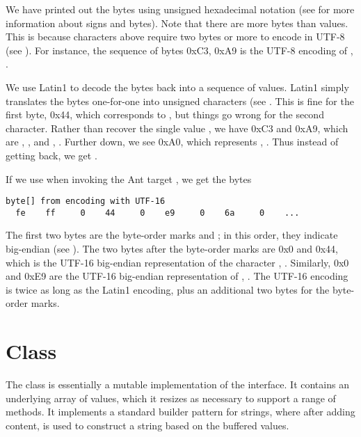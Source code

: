 We have printed out the bytes using unsigned hexadecimal notation (see
 for more information about signs and bytes).  
Note that there are more bytes than  values.  This is
because characters above  require two bytes or more to
encode in UTF-8 (see ).  For instance, the sequence of
bytes 0xC3, 0xA9 is the UTF-8 encoding of
, .

We use Latin1 to decode the bytes back into a sequence of 
values.  Latin1 simply translates the bytes one-for-one into unsigned
characters (see .  This is fine for the first byte,
0x44, which corresponds to , but things go wrong for the
second character.  Rather than recover the single  value
, we have 0xC3 and 0xA9, which are ,
, and , 
.  Further down, we see 0xA0, which
represents , .  Thus instead
of getting  back, we get 
.  

If we use  when invoking the Ant target
, we get the bytes
%
\begin{verbatim}
byte[] from encoding with UTF-16
  fe    ff     0    44     0    e9     0    6a     0    ...
\end{verbatim}
%
The first two bytes are the byte-order marks  and
; in this order, they indicate big-endian 
(see ).  The two bytes after the byte-order
marks are 0x0 and 0x44, which is the UTF-16 big-endian representation
of the character , .
Similarly, 0x0 and 0xE9 are the UTF-16 big-endian representation of
, .  The
UTF-16 encoding is twice as long as the Latin1 encoding, plus an
additional two bytes for the byte-order marks.


\section{ Class}

The  class is essentially a mutable implementation
of the  interface.  It contains an underlying array
of  values, which it resizes as necessary to support a
range of  methods.  It implements a standard
builder pattern for strings, where after adding content, 
is used to construct a string based on the buffered values.

